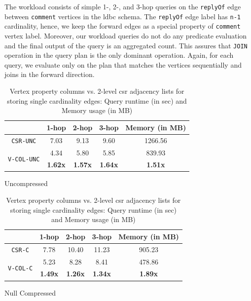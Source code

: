 The workload consists of simple 1-, 2-, and 3-hop queries on the \texttt{replyOf} edge between \texttt{comment} vertices in the \gls{ldbc} schema. The \texttt{replyOf} edge label has \texttt{n-1} cardinality, hence, we keep the forward edges as a special property of \texttt{comment} vertex label. Moreover, our workload queries do not do any predicate evaluation and the final output of the query is an aggregated count. This assures that \texttt{JOIN} operation in the query plan is the only dominant operation. Again, for each query, we evaluate only on the plan that matches the vertices sequentially and joins in the forward direction.

\begin{table}
	\centering
	\begin{subtable}{1\textwidth}
		\centering
		\bgroup
		\setlength{\tabcolsep}{8pt}
		\def\arraystretch{1.2}%
		\begin{tabular}{ |c|c|c|c|c| }
			\hline
			& \textbf{1-hop} & \textbf{2-hop} & \textbf{3-hop} & \textbf{Memory (in MB)} \\ 
			\hline \hline
			\texttt{CSR-UNC}& 7.03 & 9.13 & 9.60 & 1266.56 \\ 
			\hline
			\multirow{2}{*}{\texttt{V-COL-UNC}}& 4.34 & 5.80 & 5.85 & 839.93 \\ 
			& \textbf{1.62x} & \textbf{1.57x} & \textbf{1.64x} & \textbf{1.51x} \\ 
			\hline
		\end{tabular}
		\egroup
		\captionsetup{justification=centering}
		\caption{Uncompressed}
		\label{tbl:s1}
	\end{subtable}
	\begin{subtable}{1\textwidth}
		\centering
		\bgroup
		\setlength{\tabcolsep}{8pt}
		\def\arraystretch{1.2}
		\begin{tabular}{ |c|c|c|c|c| } 
			\hline
			& \textbf{1-hop} & \textbf{2-hop} & \textbf{3-hop} & \textbf{Memory (in MB)} \\ 
			\hline \hline
			\texttt{CSR-C}& 7.78 & 10.40 & 11.23 & 905.23 \\ 
			\hline
			\multirow{2}{*}{\texttt{V-COL-C}}& 5.23 & 8.28 & 8.41 & 478.86 \\ 
			& \textbf{1.49x} & \textbf{1.26x} & \textbf{1.34x} & \textbf{1.89x} \\ 
			\hline
		\end{tabular}
		\egroup
		\captionsetup{justification=centering}
		\caption{Null Compressed}
		\label{tbl:s2}
	\end{subtable}
	\captionsetup{justification=centering}
	\caption{Vertex property columns vs. 2-level \gls{csr} adjacency lists for storing single cardinality edges: Query runtime (in sec) and Memory usage (in MB)  }
\end{table}

